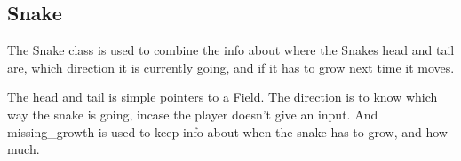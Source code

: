 \subsection{Snake}

The Snake class is used to combine the info about where the Snakes head and tail are, which direction it is currently going, and if it has to grow next time it moves.

The head and tail is simple pointers to a Field. The direction is to know which way the snake is going, incase the player doesn't give an input. And missing\_growth is used to keep info about when the snake has to grow, and how much.
